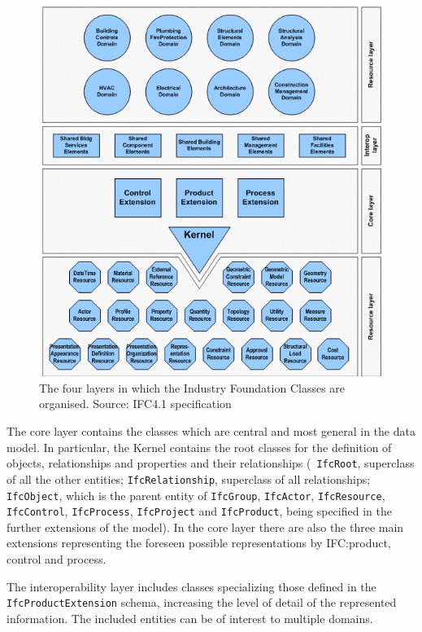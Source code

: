 \begin{figure}
	\begin{center}
		\includegraphics[width=\linewidth]{figs/IFC4LayeredArchitecture.png}
		\caption{{The four layers in which the Industry Foundation Classes are organised. Source: IFC4.1 specification}}%
		\label{fig:ifclayers}
	\end{center}
\end{figure}

The core layer contains the classes which are central and most general in the data model.
In particular, the Kernel contains the root classes for the definition of objects, relationships and properties and their relationships (\eg\ \texttt{IfcRoot}, superclass of all the other entities; \texttt{IfcRelationship}, superclass of all relationships; \texttt{IfcObject}, which is the parent entity of \texttt{IfcGroup}, \texttt{IfcActor}, \texttt{IfcResource}, \texttt{Ifc\-Con\-trol}, \texttt{IfcProcess}, \texttt{IfcProject} and \texttt{IfcProduct}, being specified in the further extensions of the model).
In the core layer there are also the three main extensions representing the foreseen possible representations by IFC:\@ product, control and process.

The interoperability layer includes classes specializing those defined in the \texttt{IfcProductExtension} schema, increasing the level of detail of the represented information. The included entities can be of interest to multiple domains.

